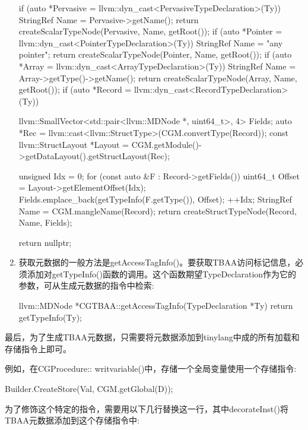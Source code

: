 \begin{enumerate}
\begin{cpp}
{    if (auto *Pervasive =
            llvm::dyn_cast<PervasiveTypeDeclaration>(Ty)) {
        StringRef Name = Pervasive->getName();
        return createScalarTypeNode(Pervasive, Name, getRoot());
    }
    if (auto *Pointer =
            llvm::dyn_cast<PointerTypeDeclaration>(Ty)) {
        StringRef Name = "any pointer";
        return createScalarTypeNode(Pointer, Name, getRoot());
    }
    if (auto *Array =
            llvm::dyn_cast<ArrayTypeDeclaration>(Ty)) {
        StringRef Name = Array->getType()->getName();
        return createScalarTypeNode(Array, Name, getRoot());
    }
    if (auto *Record =
            llvm::dyn_cast<RecordTypeDeclaration>(Ty)) {
        llvm::SmallVector<std::pair<llvm::MDNode *, uint64_t>,
        4> Fields;
        auto *Rec =
            llvm::cast<llvm::StructType>(CGM.convertType(Record));
        const llvm::StructLayout *Layout =
        CGM.getModule()->getDataLayout().getStructLayout(Rec);

        unsigned Idx = 0;
        for (const auto &F : Record->getFields()) {
            uint64_t Offset = Layout->getElementOffset(Idx);
            Fields.emplace_back(getTypeInfo(F.getType()), Offset);
            ++Idx;
        }
        StringRef Name = CGM.mangleName(Record);
        return createStructTypeNode(Record, Name, Fields);
    }
    return nullptr;
}
\end{cpp}

\item
获取元数据的一般方法是getAccessTagInfo()。要获取TBAA访问标记信息，必须添加对getTypeInfo()函数的调用。这个函数期望TypeDeclaration作为它的参数，可从生成元数据的指令中检索:

\begin{cpp}
llvm::MDNode *CGTBAA::getAccessTagInfo(TypeDeclaration *Ty) {
    return getTypeInfo(Ty);
}
\end{cpp}

\end{enumerate}

最后，为了生成TBAA元数据，只需要将元数据添加到tinylang中成的所有加载和存储指令上即可。

例如，在CGProcedure:: writvariable()中，存储一个全局变量使用一个存储指令:

\begin{cpp}
    Builder.CreateStore(Val, CGM.getGlobal(D));
\end{cpp}

为了修饰这个特定的指令，需要用以下几行替换这一行，其中decorateInst()将TBAA元数据添加到这个存储指令中:

